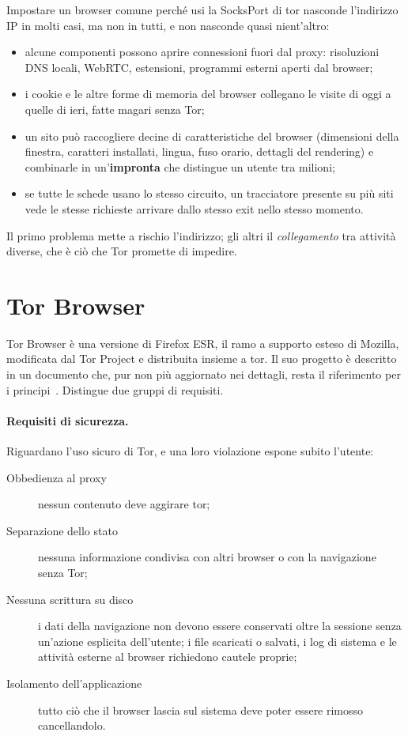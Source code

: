 Impostare un browser comune perché usi la SocksPort di tor nasconde l'indirizzo IP in molti casi, ma non in tutti, e non nasconde quasi nient'altro:
\begin{itemize}
  \item alcune componenti possono aprire connessioni fuori dal proxy: risoluzioni DNS locali, WebRTC, estensioni, programmi esterni aperti dal browser;
  \item i cookie e le altre forme di memoria del browser collegano le visite di oggi a quelle di ieri, fatte magari senza Tor;
  \item un sito può raccogliere decine di caratteristiche del browser (dimensioni della finestra, caratteri installati, lingua, fuso orario, dettagli del rendering) e combinarle in un'\textbf{impronta} che distingue un utente tra milioni;
  \item se tutte le schede usano lo stesso circuito, un tracciatore presente su più siti vede le stesse richieste arrivare dallo stesso exit nello stesso momento.
\end{itemize}
Il primo problema mette a rischio l'indirizzo; gli altri il \emph{collegamento} tra attività diverse, che è ciò che Tor promette di impedire.

\section{Tor Browser}\label{sec:browser-tb}

Tor Browser è una versione di Firefox ESR, il ramo a supporto esteso di Mozilla, modificata dal Tor Project e distribuita insieme a tor. Il suo progetto è descritto in un documento che, pur non più aggiornato nei dettagli, resta il riferimento per i principi~\cite{perry2018torbrowser}. Distingue due gruppi di requisiti.

\paragraph{Requisiti di sicurezza.} Riguardano l'uso sicuro di Tor, e una loro violazione espone subito l'utente:
\begin{description}
  \item[Obbedienza al proxy] nessun contenuto deve aggirare tor;
  \item[Separazione dello stato] nessuna informazione condivisa con altri browser o con la navigazione senza Tor;
  \item[Nessuna scrittura su disco] i dati della navigazione non devono essere conservati oltre la sessione senza un'azione esplicita dell'utente; i file scaricati o salvati, i log di sistema e le attività esterne al browser richiedono cautele proprie;
  \item[Isolamento dell'applicazione] tutto ciò che il browser lascia sul sistema deve poter essere rimosso cancellandolo.
\end{description}

